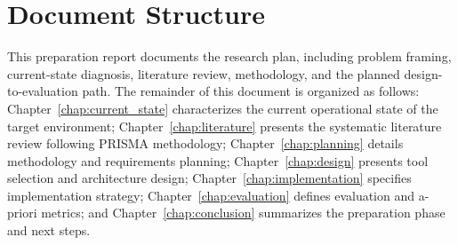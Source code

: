 \section{Document Structure}
This preparation report documents the research plan, including problem framing, current-state diagnosis, literature review, methodology, and the planned design-to-evaluation path. The remainder of this document is organized as follows: Chapter~\ref{chap:current_state} characterizes the current operational state of the target environment; Chapter~\ref{chap:literature} presents the systematic literature review following \ac{PRISMA} methodology; Chapter~\ref{chap:planning} details methodology and requirements planning; Chapter~\ref{chap:design} presents tool selection and architecture design; Chapter~\ref{chap:implementation} specifies implementation strategy; Chapter~\ref{chap:evaluation} defines evaluation and a-priori metrics; and Chapter~\ref{chap:conclusion} summarizes the preparation phase and next steps.